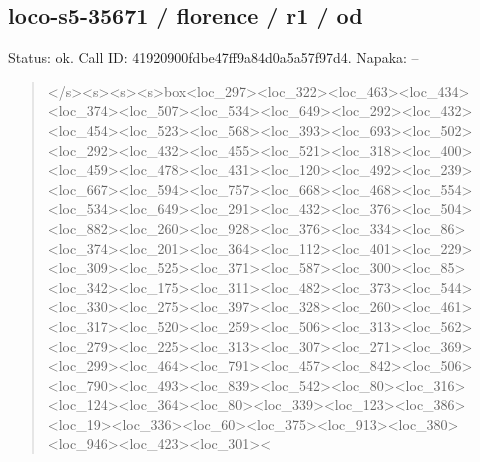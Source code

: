\documentclass[10pt,a4paper]{article}
\begin{document}
\subsection*{loco-s5-35671 / florence / r1 / od}
Status: ok. Call ID: 41920900fdbe47ff9a84d0a5a57f97d4. Napaka: --
\begin{quote}\footnotesize
</s>\allowbreak{}<s>\allowbreak{}<s>\allowbreak{}<s>\allowbreak{}box<loc\_297>\allowbreak{}<loc\_32\allowbreak{}2>\allowbreak{}<loc\_463>\allowbreak{}<loc\_434>\allowbreak{}<loc\_374>\allowbreak{}<lo\allowbreak{}c\_507>\allowbreak{}<loc\_534>\allowbreak{}<loc\_649>\allowbreak{}<loc\_292\allowbreak{}>\allowbreak{}<loc\_432>\allowbreak{}<loc\_454>\allowbreak{}<loc\_523>\allowbreak{}<loc\allowbreak{}\_568>\allowbreak{}<loc\_393>\allowbreak{}<loc\_693>\allowbreak{}<loc\_502>\allowbreak{}\allowbreak{}<loc\_292>\allowbreak{}<loc\_432>\allowbreak{}<loc\_455>\allowbreak{}<loc\_\allowbreak{}521>\allowbreak{}<loc\_318>\allowbreak{}<loc\_400>\allowbreak{}<loc\_459>\allowbreak{}<\allowbreak{}loc\_478>\allowbreak{}<loc\_431>\allowbreak{}<loc\_120>\allowbreak{}<loc\_4\allowbreak{}92>\allowbreak{}<loc\_239>\allowbreak{}<loc\_667>\allowbreak{}<loc\_594>\allowbreak{}<l\allowbreak{}oc\_757>\allowbreak{}<loc\_668>\allowbreak{}<loc\_468>\allowbreak{}<loc\_55\allowbreak{}4>\allowbreak{}<loc\_534>\allowbreak{}<loc\_649>\allowbreak{}<loc\_291>\allowbreak{}<lo\allowbreak{}c\_432>\allowbreak{}<loc\_376>\allowbreak{}<loc\_504>\allowbreak{}<loc\_882\allowbreak{}>\allowbreak{}<loc\_260>\allowbreak{}<loc\_928>\allowbreak{}<loc\_376>\allowbreak{}<loc\allowbreak{}\_334>\allowbreak{}<loc\_86>\allowbreak{}<loc\_374>\allowbreak{}<loc\_201>\allowbreak{}<\allowbreak{}loc\_364>\allowbreak{}<loc\_112>\allowbreak{}<loc\_401>\allowbreak{}<loc\_2\allowbreak{}29>\allowbreak{}<loc\_309>\allowbreak{}<loc\_525>\allowbreak{}<loc\_371>\allowbreak{}<l\allowbreak{}oc\_587>\allowbreak{}<loc\_300>\allowbreak{}<loc\_85>\allowbreak{}<loc\_342\allowbreak{}>\allowbreak{}<loc\_175>\allowbreak{}<loc\_311>\allowbreak{}<loc\_482>\allowbreak{}<loc\allowbreak{}\_373>\allowbreak{}<loc\_544>\allowbreak{}<loc\_330>\allowbreak{}<loc\_275>\allowbreak{}\allowbreak{}<loc\_397>\allowbreak{}<loc\_328>\allowbreak{}<loc\_260>\allowbreak{}<loc\_\allowbreak{}461>\allowbreak{}<loc\_317>\allowbreak{}<loc\_520>\allowbreak{}<loc\_259>\allowbreak{}<\allowbreak{}loc\_506>\allowbreak{}<loc\_313>\allowbreak{}<loc\_562>\allowbreak{}<loc\_2\allowbreak{}79>\allowbreak{}<loc\_225>\allowbreak{}<loc\_313>\allowbreak{}<loc\_307>\allowbreak{}<l\allowbreak{}oc\_271>\allowbreak{}<loc\_369>\allowbreak{}<loc\_299>\allowbreak{}<loc\_46\allowbreak{}4>\allowbreak{}<loc\_791>\allowbreak{}<loc\_457>\allowbreak{}<loc\_842>\allowbreak{}<lo\allowbreak{}c\_506>\allowbreak{}<loc\_790>\allowbreak{}<loc\_493>\allowbreak{}<loc\_839\allowbreak{}>\allowbreak{}<loc\_542>\allowbreak{}<loc\_80>\allowbreak{}<loc\_316>\allowbreak{}<loc\_\allowbreak{}124>\allowbreak{}<loc\_364>\allowbreak{}<loc\_80>\allowbreak{}<loc\_339>\allowbreak{}<l\allowbreak{}oc\_123>\allowbreak{}<loc\_386>\allowbreak{}<loc\_19>\allowbreak{}<loc\_336\allowbreak{}>\allowbreak{}<loc\_60>\allowbreak{}<loc\_375>\allowbreak{}<loc\_913>\allowbreak{}<loc\_\allowbreak{}380>\allowbreak{}<loc\_946>\allowbreak{}<loc\_423>\allowbreak{}<loc\_301>\allowbreak{}<\allow
\end{quote}
\end{document}
